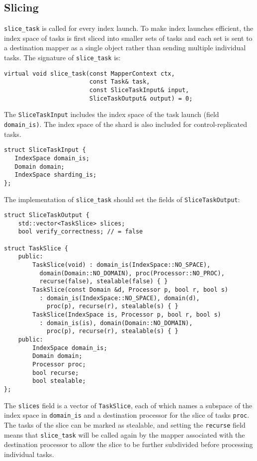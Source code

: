\subsection{Slicing}
{\tt slice\_task} is called for every index launch.  To make index launches efficient, the index space of tasks is first sliced into smaller sets of tasks and each set is sent to a destination mapper as a single object rather than sending
multiple individual tasks.  The signature of {\tt slice\_task} is:
\begin{lstlisting}
virtual void slice_task(const MapperContext ctx,
                        const Task& task,
                        const SliceTaskInput& input,
                        SliceTaskOutput& output) = 0;
\end{lstlisting}


The {\tt SliceTaskInput} includes the index space of the task launch (field {\tt domain\_is)}.  The index space of the shard is also included for control-replicated tasks.
\begin{lstlisting}
struct SliceTaskInput {
   IndexSpace domain_is;
   Domain domain;
   IndexSpace sharding_is;
};
\end{lstlisting}
The implementation of {\tt slice\_task} should set the fields of {\tt SliceTaskOutput}:
\begin{lstlisting}
struct SliceTaskOutput {
    std::vector<TaskSlice> slices;
    bool verify_correctness; // = false                                                                                            

struct TaskSlice {
    public:
        TaskSlice(void) : domain_is(IndexSpace::NO_SPACE),
          domain(Domain::NO_DOMAIN), proc(Processor::NO_PROC),
          recurse(false), stealable(false) { }
        TaskSlice(const Domain &d, Processor p, bool r, bool s)
          : domain_is(IndexSpace::NO_SPACE), domain(d),
            proc(p), recurse(r), stealable(s) { }
        TaskSlice(IndexSpace is, Processor p, bool r, bool s)
          : domain_is(is), domain(Domain::NO_DOMAIN),
            proc(p), recurse(r), stealable(s) { }
    public:
        IndexSpace domain_is;
        Domain domain;
        Processor proc;
        bool recurse;
        bool stealable;
};
\end{lstlisting}
The {\tt slices} field is a vector of {\tt TaskSlice}, each of which names a subspace of the index space in {\tt domain\_is} and a destination processor for the slice of tasks {\tt proc}.  The tasks of the slice can be marked as stealable, and setting the {\tt recurse} field
means that {\tt slice\_task} will be called again by the mapper associated with the destination processor to allow the slice to be further subdivided before processing individual tasks.

